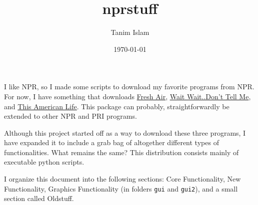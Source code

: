 \documentclass[]{article}
\title{nprstuff}
\date{\today}
\author{Tanim Islam}
\begin{document}
\maketitle

I like NPR, so I made some scripts to download my favorite programs from NPR. For now, I have something that downloads \href{http://www.npr.org/programs/fresh-air/}{Fresh Air},
\href{http://www.npr.org/programs/wait-wait-dont-tell-me/}{Wait Wait..Don't Tell Me}, and \href{http://www.thisamericanlife.org/}{This American Life}. This package can probably, straightforwardly be extended to other NPR and PRI programs.

Although this project started off as a way to download these three programs, I have expanded it to include a grab bag of altogether different types of functionalities. What remains the same? This distribution consists mainly of executable python scripts.

I organize this document into the following sections: Core Functionality, New Functionality, Graphics Functionality (in folders {\verb|gui|} and {\verb|gui2|}), and a small section called Oldstuff. 
\end{document}
